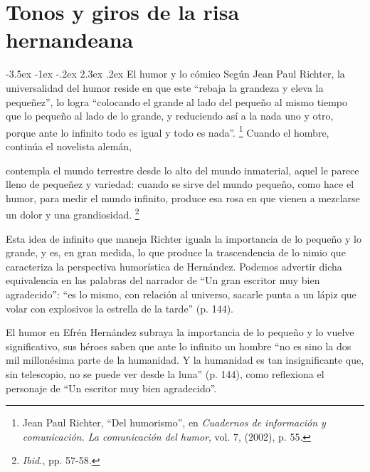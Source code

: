 \documentclass[14pt,twoside,final]{extbook} %
\makeatletter
\let\oldfootnote\footnote
\renewcommand\footnote[1]{%
\oldfootnote{\hspace{1mm}#1}}
\renewcommand\section{\@startsection {section}{1}{\z@}%
                                     {-3.5ex \@plus -1ex \@minus -.2ex}%
                                     {2.3ex \@plus .2ex}%
                                     {\normalfont\large\bfseries\sc}}
\makeatother
\begin{document}
\chapter[\textsc{Tonos y giros de la risa hernandeana}]{Tonos y giros de la risa hernandeana}\label{ch:tonos-y-giros-de-la-risa-hernandeana}
\BgThispage
\thispagestyle{empty}
\pagestyle{fancy}
\fancyhf{} %
\fancyhead[RO,LE]{\thepage}
\renewcommand{\headrulewidth}{0pt}
\setcounter{page}{105}
\section{El humor y lo cómico}\label{sec:el-humor-y-lo-comico}
Según Jean Paul Richter, la universalidad del humor reside en que este ``rebaja la grandeza y eleva la pequeñez'', lo logra ``colocando el grande al lado del pequeño al mismo tiempo que lo pequeño al lado de lo grande, y reduciendo así a la nada uno y otro, porque ante lo infinito todo es igual y todo es nada''.\footnote{Jean Paul Richter, ``Del humorismo'', en \emph{Cuadernos de información y comunicación. La comunicación del humor}, vol. 7, (2002), p. 55.} Cuando el hombre, continúa el novelista alemán,
\begin{quoting}
contempla el mundo terrestre desde lo alto del mundo inmaterial, aquel le parece lleno de pequeñez y variedad: cuando se sirve del mundo pequeño, como hace el humor, para medir el mundo infinito, produce esa rosa en que vienen a mezclarse un dolor y una grandiosidad.\footnote{\emph{Ibid.}, pp. 57-58.}
\end{quoting}
Esta idea de infinito que maneja Richter iguala la importancia de lo pequeño y lo grande, y es, en gran medida, lo que produce la trascendencia de lo nimio que caracteriza la perspectiva humorística de Hernández. Podemos advertir dicha equivalencia en las palabras del narrador de ``Un gran escritor muy bien agradecido'': ``es lo mismo, con relación al universo, sacarle punta a un lápiz que volar con explosivos la estrella de la tarde'' (p. 144).

El humor en Efrén Hernández subraya la importancia de lo pequeño y lo vuelve significativo, sus héroes saben que ante lo infinito un hombre ``no es sino la dos mil millonésima parte de la humanidad. Y la humanidad es tan insignificante que, sin telescopio, no se puede ver desde la luna'' (p. 144), como reflexiona el personaje de ``Un escritor muy bien agradecido''.
\end{document}
